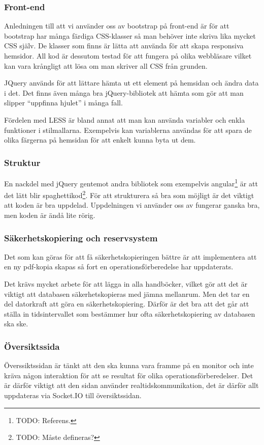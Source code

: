 \documentclass{article}
\begin{document}
\subsubsection{Front-end}
Anledningen till att vi använder oss av bootstrap på front-end är för att bootstrap har många färdiga CSS-klasser så man behöver inte skriva lika mycket CSS själv.
De klasser som finns är lätta att använda för att skapa responsiva hemsidor.
All kod är dessutom testad för att fungera på olika webbläsare vilket kan vara krångligt att lösa om man skriver all CSS från grunden.

JQuery används för att lättare hämta ut ett element på hemsidan och ändra data i det.
Det finns även många bra jQuery-bibliotek att hämta som gör att man slipper “uppfinna hjulet” i många fall.

Fördelen med LESS är bland annat att man kan använda variabler och enkla funktioner i stilmallarna.
Exempelvis kan variablerna användas för att spara de olika färgerna på hemsidan för att enkelt kunna byta ut dem.

\subsubsection{Struktur}
En nackdel med jQuery gentemot andra bibliotek som exempelvis angular\footnote{TODO: Referens.} är att det lätt blir spaghettikod\footnote{TODO: Måste defineras?}.
För att strukturera så bra som möjligt är det viktigt att koden är bra uppdelad.
Uppdelningen vi använder oss av fungerar ganska bra, men koden är ändå lite rörig.

\subsubsection{Säkerhetskopiering och reservsystem}
Det som kan göras för att få säkerhetskopieringen bättre är att implementera att en ny pdf-kopia skapas så fort en operationsförberedelse har uppdaterats.

Det krävs mycket arbete för att lägga in alla handböcker, vilket gör att det är viktigt att databasen säkerhetskopieras med jämna mellanrum. Men det tar en del datorkraft att göra en säkerhetskopiering. Därför är det bra att det går att ställa in tidsintervallet som bestämmer hur ofta säkerhetskopiering av databasen ska ske.

\subsubsection{Översiktssida}
Överssiktssidan är tänkt att den ska kunna vara framme på en monitor och inte kräva någon interaktion för att se resultat för olika operationsförberedelser. Det är därför viktigt att den sidan använder realtidskommunikation, det är därför allt uppdateras via Socket.IO till översiktssidan.
\end{document}
